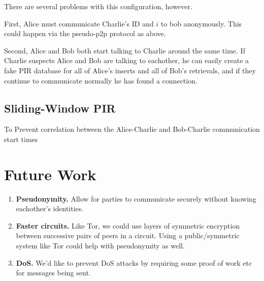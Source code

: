 \documentclass{paper}
\begin{document}
There are several problems with this configuration, however.

First, Alice must communicate Charlie's ID and $i$ to bob anonymously. This could happen via the pseudo-p2p protocol as above. 

Second, Alice and Bob both start talking to Charlie around the same time. If Charlie suspects Alice and Bob are talking to eachother, he can easily create a fake PIR database for all of Alice's inserts and all of Bob's retrievals, and if they continue to communicate normally he has found a connection. 

\subsection{Sliding-Window PIR}
To Prevent correlation between the Alice-Charlie and Bob-Charlie communication start times 


\section{Future Work}
\begin{enumerate}
  \item \textbf{Pseudonymity.} Allow for parties to communicate securely without knowing eachother's identities.
  \item \textbf{Faster circuits.} Like Tor, we could use layers of symmetric encryption between successive pairs of peers in a circuit. Using a public/symmetric system like Tor could help with pseudonymity as well.
  \item \textbf{DoS.} We'd like to prevent DoS attacks by requiring some proof of work etc for messages being sent. 
\end{enumerate}

\newpage



\end{document}
